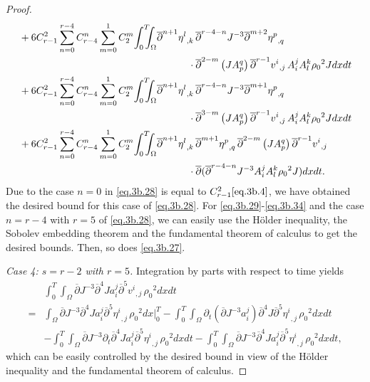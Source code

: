 \documentclass[12pt,twoside,reqno]{amsart}
\numberwithin{equation}{section}
\theoremstyle{definition}
\theoremstyle{remark}
\begin{document}
\begin{proof}
\begin{align}
  &+6C_{r-1}^2\sum_{n=0}^{r-4}C_{r-4}^n \sum_{m=0}^1C_2^m{\int_0^T\!\!\!\!\int_\Omega }{{{{\overline{\partial}}^{n+1}\eta^l}}_{,{k}}\,}{\overline{\partial}}^{r-4-n}J^{-3} {{{{\overline{\partial}}^{m+2}\eta^p}}_{,{q}}\,}\label{eq.3b.32}\\
  &\qquad\qquad\qquad\qquad\qquad\qquad\qquad\quad\qquad\cdot{\overline{\partial}}^{2-m}\left( JA^q_p\right) {{{{\overline{\partial}}^{r-1} v^i}}_{,{j}}\,} A^j_i A^k_l{\rho_0}^2 J dxdt{\nonumber}\\
  &+6C_{r-1}^2\sum_{n=0}^{r-4}C_{r-4}^n \sum_{m=0}^1C_2^m{\int_0^T\!\!\!\!\int_\Omega }{{{{\overline{\partial}}^{n+1}\eta^l}}_{,{k}}\,}{\overline{\partial}}^{r-4-n}J^{-3} {{{{\overline{\partial}}^{m+1}\eta^p}}_{,{q}}\,}\label{eq.3b.33}\\
  &\qquad\qquad\qquad\qquad\qquad\qquad\qquad\quad\qquad\cdot{\overline{\partial}}^{3-m}\left( JA^q_p\right) {{{{\overline{\partial}}^{r-1} v^i}}_{,{j}}\,} A^j_i A^k_l{\rho_0}^2 J dxdt{\nonumber}\\
  &+6C_{r-1}^2\sum_{n=0}^{r-4}C_{r-4}^n \sum_{m=0}^1C_2^m{\int_0^T\!\!\!\!\int_\Omega }{{{{\overline{\partial}}^{n+1}\eta^l}}_{,{k}}\,} {{{{\overline{\partial}}^{m+1}\eta^p}}_{,{q}}\,}{\overline{\partial}}^{2-m}\left( JA^q_p\right){{{{\overline{\partial}}^{r-1} v^i}}_{,{j}}\,}\label{eq.3b.34}\\
  &\qquad\qquad\qquad\qquad\qquad\qquad\qquad\quad\qquad\cdot{\overline{\partial}}({\overline{\partial}}^{r-4-n}J^{-3} A^j_i A^k_l{\rho_0}^2 J) dxdt.{\nonumber}
\end{align}
Due to the case $n=0$ in \eqref{eq.3b.28} is equal to $C_{r-1}^2\eqref{eq.3b.4}$, we have obtained the desired bound for this case of \eqref{eq.3b.28}. For \eqref{eq.3b.29}-\eqref{eq.3b.34} and the case $n=r-4$ with $r=5$ of \eqref{eq.3b.28}, we can easily use the H\"older inequality, the Sobolev embedding theorem and the fundamental theorem of calculus to get the desired bounds. Then, so does \eqref{eq.3b.27}.

\emph{Case 4: $s=r-2$ with $r=5$.} Integration by parts with respect to time yields
\begin{align*}
  &{\int_0^T\!\!\!\!\int_\Omega } {\overline{\partial}} J^{-3}{\overline{\partial}}^{4} J a^j_i{{{{\overline{\partial}}^5 v^i}}_{,{j}}\,}{\rho_0}^2  dxdt\\
  =&\int_\Omega {\overline{\partial}} J^{-3}{\overline{\partial}}^{4} J a^j_i{{{{\overline{\partial}}^5 \eta^i}}_{,{j}}\,}{\rho_0}^2  dx\Big|_0^T-{\int_0^T\!\!\!\!\int_\Omega } {\partial}_t({\overline{\partial}} J^{-3}a^j_i){\overline{\partial}}^{4} J{{{{\overline{\partial}}^5 \eta^i}}_{,{j}}\,}{\rho_0}^2  dxdt\\
  &-{\int_0^T\!\!\!\!\int_\Omega } {\overline{\partial}} J^{-3}{\partial}_t{\overline{\partial}}^{4} J a^j_i{{{{\overline{\partial}}^5 \eta^i}}_{,{j}}\,}{\rho_0}^2  dxdt-{\int_0^T\!\!\!\!\int_\Omega } {\overline{\partial}} J^{-3}{\overline{\partial}}^{4} J a^j_i{{{{\overline{\partial}}^5 \eta^i}}_{,{j}}\,}{\rho_0}^2  dxdt,
\end{align*}
which can be easily controlled by the desired bound in view of the H\"older inequality and the fundamental theorem of calculus.


\end{proof}
\end{document}
